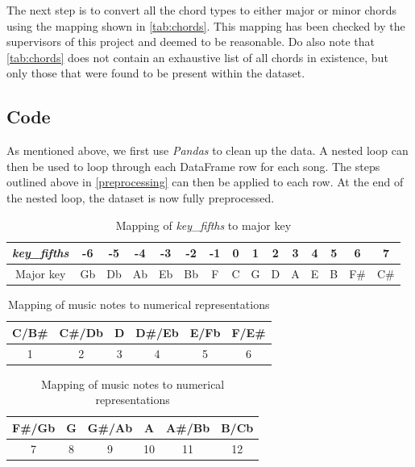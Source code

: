 The next step is to convert all the chord types to either major or minor chords using the mapping shown in \cref{tab:chords}. This mapping has been checked by the supervisors of this project and deemed to be reasonable. Do also note that \cref{tab:chords} does not contain an exhaustive list of all chords in existence, but only those that were found to be present within the dataset.

\subsection{Code}
As mentioned above, we first use \emph{Pandas} to clean up the data. A nested loop can then be used to loop through each DataFrame row for each song. The steps outlined above in \cref{preprocessing} can then be applied to each row. At the end of the nested loop, the dataset is now fully preprocessed.


    \begin{table}
        \caption{Mapping of \emph{key\_fifths} to major key}
        \label{tab:kf_map}
        \centering
        \begin{tabular}{|c||c|c|c|c|c|c|c|c|c|c|c|c|c|c|}
        \hline
        \emph{key\_fifths} & -6 & -5 & -4 & -3 & -2 & -1 & 0 & 1 & 2 & 3 & 4 & 5 & 6 & 7 \\
        \hline
        Major key & Gb & Db & Ab & Eb & Bb & F & C & G & D & A & E & B & F\# & C\# \\
        \hline
        \end{tabular}
        \end{table}

\begin{table}
    \caption{Mapping of music notes to numerical representations}
    \label{tab:note_map}
    \centering
    \begin{tabular}{|c|c|c|c|c|c|}
    \hline
    C/B\# & C\#/Db & D & D\#/Eb & E/Fb & F/E\# \\
    \hline
    1 & 2 & 3 & 4 & 5 & 6 \\
    \hline
    \end{tabular}
    \begin{tabular}{|c|c|c|c|c|c|}
        \hline
    F\#/Gb & G & G\#/Ab & A & A\#/Bb & B/Cb\\
    \hline
    7 & 8 & 9 & 10 & 11 & 12\\
    \hline
    \end{tabular}
    \end{table}

